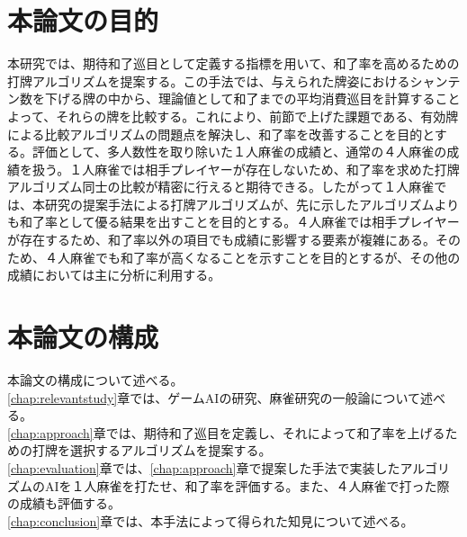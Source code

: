 \section{本論文の目的}
本研究では、期待和了巡目として定義する指標を用いて、和了率を高めるための打牌アルゴリズムを提案する。この手法では、与えられた牌姿におけるシャンテン数を下げる牌の中から、理論値として和了までの平均消費巡目を計算することよって、それらの牌を比較する。これにより、前節で上げた課題である、有効牌による比較アルゴリズムの問題点を解決し、和了率を改善することを目的とする。評価として、多人数性を取り除いた１人麻雀の成績と、通常の４人麻雀の成績を扱う。１人麻雀では相手プレイヤーが存在しないため、和了率を求めた打牌アルゴリズム同士の比較が精密に行えると期待できる。したがって１人麻雀では、本研究の提案手法による打牌アルゴリズムが、先に示したアルゴリズムよりも和了率として優る結果を出すことを目的とする。４人麻雀では相手プレイヤーが存在するため、和了率以外の項目でも成績に影響する要素が複雑にある。そのため、４人麻雀でも和了率が高くなることを示すことを目的とするが、その他の成績においては主に分析に利用する。
\section{本論文の構成}
本論文の構成について述べる。
\\\ref{chap:relevantstudy}章では、ゲームAIの研究、麻雀研究の一般論について述べる。
\\\ref{chap:approach}章では、期待和了巡目を定義し、それによって和了率を上げるための打牌を選択するアルゴリズムを提案する。
\\\ref{chap:evaluation}章では、\ref{chap:approach}章で提案した手法で実装したアルゴリズムのAIを１人麻雀を打たせ、和了率を評価する。また、４人麻雀で打った際の成績も評価する。
\\\ref{chap:conclusion}章では、本手法によって得られた知見について述べる。
